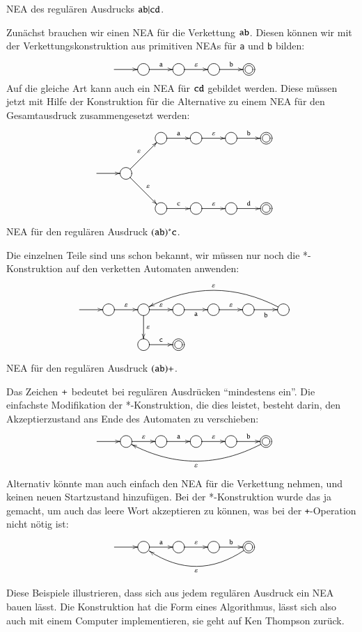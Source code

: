 \begin{beispiel}[\bf Beispiel 1] NEA des regulären Ausdrucks
${\tt ab}|{\tt cd}$.

Zunächst brauchen wir einen NEA für die Verkettung ${\tt ab}$.
Diesen können wir mit der Verkettungskonstruktion aus primitiven
NEAs für {\tt a} und {\tt b} bilden:
\[
\entrymodifiers={++[o][F]}
\xymatrix{
*+\txt{}\ar[r]
	&{}\ar[r]^{\tt a}
		&{}\ar[r]^{\varepsilon}
			&{}\ar[r]^{\tt b}
				&*++[o][F=]{}
}
\]
Auf die gleiche Art kann auch ein NEA für ${\tt cd}$ gebildet werden.
Diese müssen jetzt mit Hilfe der Konstruktion für die Alternative
zu einem NEA für den Gesamtausdruck zusammengesetzt werden:
\[
\entrymodifiers={++[o][F]}
\xymatrix{
*+\txt{}
	&*+\txt{}
		&{}\ar[r]^{\tt a}
			&{}\ar[r]^{\varepsilon}
				&{}\ar[r]^{\tt b}
					&*++[o][F=]{}
\\
*+\txt{} \ar[r]
	&{}\ar[ur]^{\varepsilon} \ar[dr]^{\varepsilon}
\\
*+\txt{}
	&*+\txt{}
		&{}\ar[r]^{\tt c}
			&{}\ar[r]^{\varepsilon}
				&{}\ar[r]^{\tt d}
					&*++[o][F=]{}
}
\]
\end{beispiel}

\begin{beispiel}[\bf Beispiel 2] NEA für den regulären Ausdruck
$({\tt ab})^*{\tt c}$.

Die einzelnen Teile sind uns schon bekannt, wir müssen nur noch
die *-Konstruktion auf den verketten Automaten anwenden:
\[
\entrymodifiers={++[o][F]}
\xymatrix{
*+\txt{}\ar[r]
	&{}\ar[r]^{\varepsilon}
		&{}\ar[r]^{\varepsilon}
			\ar[d]^{\varepsilon}
			&\ar[r]_{\tt a}
				&{}\ar[r]^{\varepsilon}
					&{}\ar[r]_{\tt b}
						&{}\ar@/_20pt/[llll]_{\varepsilon}
\\
*+\txt{}
	&*+\txt{}
		&{}\ar[r]^{\tt c}
			&*++[o][F=]{}
}
\]
\end{beispiel}

\begin{beispiel}[\bf Beispiel 3:] NEA für den regulären Ausdruck
$({\tt ab})+$.

Das Zeichen ${\tt+}$ bedeutet bei regulären Ausdrücken ``mindestens ein''.
Die einfachste Modifikation der *-Konstruktion, die dies leistet, besteht
darin, den Akzeptierzustand ans Ende des Automaten zu verschieben:
\[
\entrymodifiers={++[o][F]}
\xymatrix{
*+\txt{}\ar[r]
	&{}\ar[r]^{\varepsilon}
		&{}\ar[r]^{\tt a}
			&{}\ar[r]^{\varepsilon}
				&{}\ar[r]^{\tt b}
					&*++[o][F=]{}\ar@/^20pt/[llll]^{\varepsilon}
}
\]
Alternativ könnte man auch einfach den NEA für die Verkettung
nehmen, und keinen neuen Startzustand hinzufügen.
Bei der
*-Konstruktion wurde das ja gemacht, um auch das leere Wort
akzeptieren zu können, was bei der {\tt +}-Operation nicht
nötig ist:
\[
\entrymodifiers={++[o][F]}
\xymatrix{
*+\txt{}\ar[r]
	&{}\ar[r]^{\tt a}
		&{}\ar[r]^{\varepsilon}
			&{}\ar[r]^{\tt b}
				&*++[o][F=]{}\ar@/^20pt/[lll]^{\varepsilon}
}
\]
\end{beispiel}
Diese Beispiele illustrieren, dass sich aus jedem regulären Ausdruck
ein NEA bauen lässt.
Die Konstruktion hat die Form eines Algorithmus,
lässt sich also auch mit einem Computer implementieren, sie geht
auf Ken Thompson zurück.

